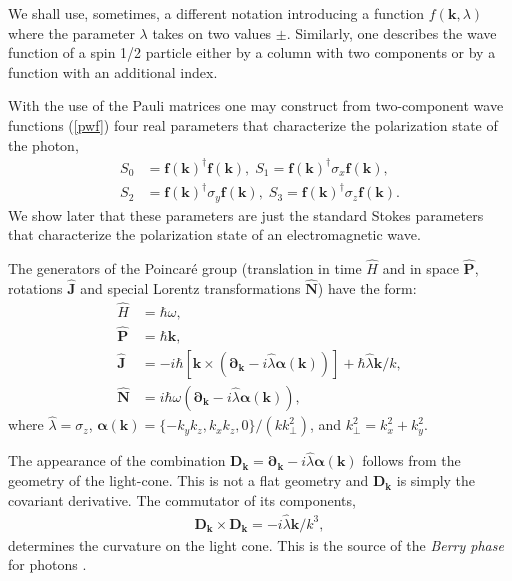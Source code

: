 \documentclass[onecolumn,aps,pra,12pt]{revtex4-1}
\begin{document}
We shall use, sometimes, a different notation introducing a function $f({\bm k},\lambda)$ where the parameter $\lambda$ takes on two values $\pm$. Similarly, one describes the wave function of a spin 1/2 particle either by a column with two components or by a function with an additional index.

With the use of the Pauli matrices one may construct from two-component wave functions (\ref{pwf}) four real parameters that characterize the polarization state of the photon,
\begin{align}\label{stokes}
S_0&={\mathfrak{\bm{f}}({\bm k})}^\dagger{\mathfrak{\bm{f}}({\bm k})},\; S_1={\mathfrak{\bm{f}}({\bm k})}^\dagger\sigma_x{\mathfrak{\bm{f}}({\bm k})},\nonumber\\
S_2&={\mathfrak{\bm{f}}({\bm k})}^\dagger\sigma_y{\mathfrak{\bm{f}}({\bm k})},\; S_3={\mathfrak{\bm{f}}({\bm k})}^\dagger\sigma_z{\mathfrak{\bm{f}}({\bm k})}.
\end{align}
We show later that these parameters are just the standard Stokes parameters that characterize the polarization state of an electromagnetic wave.

The generators of the Poincar\'e group \cite{tom,qed} (translation in time ${\hat H}$ and in space ${\hat{\bm P}}$, rotations ${\hat{\bm J}}$ and special Lorentz transformations ${\hat{\bm N}}$) have the form:
\begin{align}
{\hat H}&=\hbar\omega,\label{en}\\
{\hat{\bm P}}&=\hbar{\bm k},\label{mom}\\
{\hat{\bm J}}&=-i\hbar\left[{\bm k}\times\left({\bm{\partial}_{\bm k}}-i{\hat{\lambda}}{\bm\alpha}({\bm k})\right)\right]+\hbar{\hat{\lambda}}{\bm k}/k,\label{angm}\\
{\hat{\bm N}}&=i\hbar\omega\left({{\bm{\partial}_{\bm k}}-i{\hat{\lambda}}{\bm\alpha}({\bm k})}\right),\label{boost}
\end{align}
where $\hat{\lambda}=\sigma_z$, $\bm\alpha(\bm k)=\{-k_yk_z,k_xk_z,0\}/(kk_\perp^2)$, and $k_\perp^2=k_x^2+k_y^2$.

The appearance of the combination ${\bm D}_{\bm k}={\bm{\partial}_{\bm k}}-i{\hat{\lambda}}{\bm\alpha}({\bm k})$ follows from the geometry of the light-cone. This is not a flat geometry and ${\bm D}_{\bm k}$ is simply the covariant derivative. The commutator of its components,
\begin{align}
{\bm D}_{\bm k}\times{\bm D}_{\bm k}= -i{\hat{\lambda}}{\bm k}/k^3,
\end{align}
determines the curvature on the light cone. This is the source of the {\em Berry phase} for photons  \cite{hols,berry}.
\end{document}
